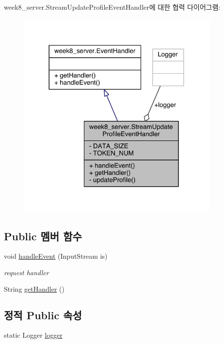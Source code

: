 week8\-\_\-server.\-Stream\-Update\-Profile\-Event\-Handler에 대한 협력 다이어그램\-:
\nopagebreak
\begin{figure}[H]
\begin{center}
\leavevmode
\includegraphics[width=288pt]{classweek8__server_1_1_stream_update_profile_event_handler__coll__graph}
\end{center}
\end{figure}
\subsection*{Public 멤버 함수}
\begin{DoxyCompactItemize}
\item 
void \hyperlink{classweek8__server_1_1_stream_update_profile_event_handler_a9cf985ef61eff5226bc397d72847abed}{handle\-Event} (Input\-Stream is)
\begin{DoxyCompactList}\small\item\em request handler \end{DoxyCompactList}\item 
String \hyperlink{classweek8__server_1_1_stream_update_profile_event_handler_a0f5b195408dd8fb6b250ce8531a71f02}{get\-Handler} ()
\end{DoxyCompactItemize}
\subsection*{정적 Public 속성}
\begin{DoxyCompactItemize}
\item 
static Logger \hyperlink{classweek8__server_1_1_stream_update_profile_event_handler_ad704bc0908f0f6b43b7cc21887990f0e}{logger}
\end{DoxyCompactItemize}
